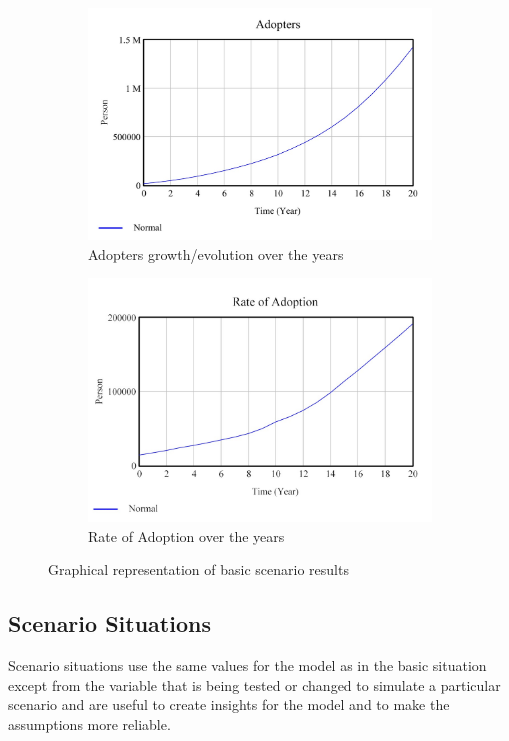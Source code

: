 \begin{figure}[htbp]
\centering
\begin{subfigure}{0.55\textwidth}
  \centering
  \includegraphics[width=0.98\linewidth]{img/results-basic.jpg}
  \caption{Adopters growth/evolution over the years}
  \label{fig:adopters}
\end{subfigure}%
\begin{subfigure}{0.45\textwidth}
  \centering
  \includegraphics[width=0.98\linewidth]{img/results-basic-adoption-rate.jpg}
  \caption{Rate of Adoption over the years}
  \label{fig:adoption-rate}
\end{subfigure}
\caption{Graphical representation of basic scenario results}
\label{fig:basic-scenario}
\end{figure}

\subsection{Scenario Situations}
Scenario situations use the same values for the model as in the basic situation except from the variable that is being tested or changed to simulate a particular scenario and are useful to create insights for the model and to make the assumptions more reliable.

